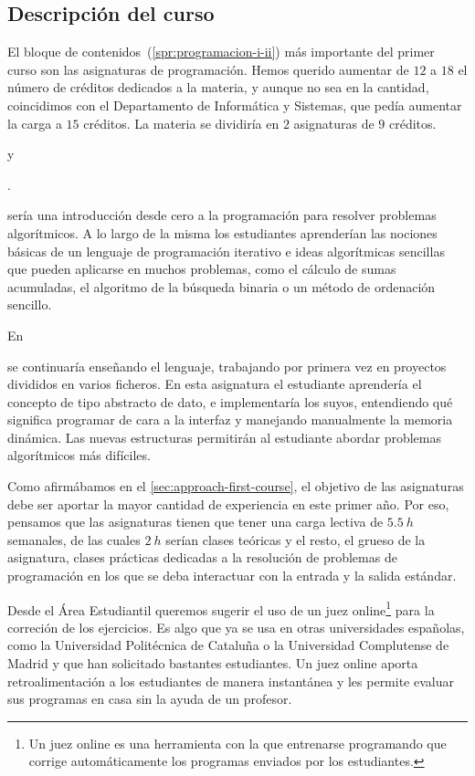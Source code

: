 \subsection{Descripción del curso}

El bloque de contenidos~(\cref{spr:programacion-i-ii})
más importante del primer curso son las asignaturas de programación.
Hemos querido aumentar de $12$ a $18$ el número de créditos
dedicados a la materia, y aunque no sea en la cantidad,
coincidimos con el Departamento de Informática y Sistemas,
que pedía aumentar la carga a $15$ créditos.
La materia se dividiría en $2$ asignaturas de $9$ créditos.
\subject{Programación I} y \subject{Programación II}.

\subject{Programación I} sería una introducción desde cero a la programación
para resolver problemas algorítmicos.
A lo largo de la misma los estudiantes aprenderían las nociones básicas
de un lenguaje de programación iterativo e
ideas algorítmicas sencillas que pueden aplicarse en muchos problemas,
como el cálculo de sumas acumuladas,
el algoritmo de la búsqueda binaria
o un método de ordenación sencillo.

En \subject{Programación II} se continuaría enseñando el lenguaje,
trabajando por primera vez en proyectos divididos en varios ficheros.
En esta asignatura el estudiante aprendería
el concepto de tipo abstracto de dato,
e implementaría los suyos,
entendiendo qué significa programar de cara a la interfaz
y manejando manualmente la memoria dinámica.
Las nuevas estructuras permitirán al estudiante
abordar problemas algorítmicos más difíciles.

Como afirmábamos en el \cref{sec:approach-first-course},
el objetivo de las asignaturas debe ser
aportar la mayor cantidad de experiencia en este primer año.
Por eso, pensamos que las asignaturas
tienen que tener una carga lectiva de $\SI{5.5}{h}$ semanales,
de las cuales $\SI{2}{h}$ serían clases teóricas y el resto,
el grueso de la asignatura,
clases prácticas dedicadas a la resolución de problemas de programación
en los que se deba interactuar con la entrada y la salida estándar.

Desde el Área Estudiantil queremos sugerir el uso de un juez online\footnote{
    Un juez online es una herramienta con la que entrenarse programando
    que corrige automáticamente los programas enviados por los estudiantes.
} para la correción de los ejercicios.
Es algo que ya se usa en otras universidades españolas,
como la Universidad Politécnica de Cataluña o
la Universidad Complutense de Madrid y
que han solicitado bastantes estudiantes.
Un juez online aporta retroalimentación a los estudiantes de manera instantánea
y les permite evaluar sus programas en casa sin la ayuda de un profesor.

